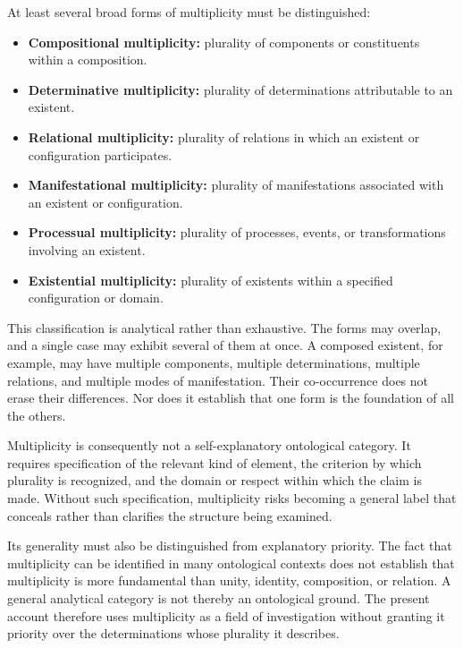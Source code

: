 At least several broad forms of multiplicity must be distinguished:

\begin{itemize}
    \item \textbf{Compositional multiplicity:} plurality of components
    or constituents within a composition.
    \item \textbf{Determinative multiplicity:} plurality of
    determinations attributable to an existent.
    \item \textbf{Relational multiplicity:} plurality of relations
    in which an existent or configuration participates.
    \item \textbf{Manifestational multiplicity:} plurality of
    manifestations associated with an existent or configuration.
    \item \textbf{Processual multiplicity:} plurality of processes,
    events, or transformations involving an existent.
    \item \textbf{Existential multiplicity:} plurality of existents
    within a specified configuration or domain.
\end{itemize}

This classification is analytical rather than exhaustive. The forms
may overlap, and a single case may exhibit several of them at once.
A composed existent, for example, may have multiple components,
multiple determinations, multiple relations, and multiple modes of
manifestation. Their co-occurrence does not erase their differences.
Nor does it establish that one form is the foundation of all the
others.

Multiplicity is consequently not a self-explanatory ontological
category. It requires specification of the relevant kind of element,
the criterion by which plurality is recognized, and the domain or
respect within which the claim is made. Without such specification,
multiplicity risks becoming a general label that conceals rather
than clarifies the structure being examined.

Its generality must also be distinguished from explanatory priority.
The fact that multiplicity can be identified in many ontological
contexts does not establish that multiplicity is more fundamental
than unity, identity, composition, or relation. A general analytical
category is not thereby an ontological ground. The present account
therefore uses multiplicity as a field of investigation without
granting it priority over the determinations whose plurality it
describes.

